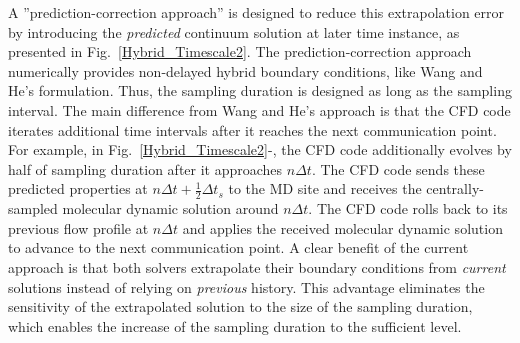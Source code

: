 \documentclass[preprint,12pt]{elsarticle}
\begin{document}

A ''prediction-correction approach'' is designed to reduce this 
extrapolation error by introducing the \textit{predicted} continuum solution at
later time instance, as presented in Fig.~\ref{Hybrid_Timescale2}.
The prediction-correction approach numerically provides non-delayed hybrid
boundary conditions, like Wang and He's formulation. Thus, the sampling
duration is designed as long as the sampling interval.
The main difference from Wang and He's approach is that the CFD code
iterates additional time intervals after it reaches the next communication point.
For example, in Fig.~\ref{Hybrid_Timescale2}-,
the CFD code additionally evolves by half of sampling duration after
it approaches $n{\Delta}t$. The CFD code sends these predicted properties
at $n{\Delta}t + \frac{1}{2}{\Delta}{t_s}$ to the MD site and receives the
centrally-sampled molecular dynamic solution around $n{\Delta}t$.
The CFD code rolls back to its previous flow profile at $n{\Delta}t$ and
applies the received molecular dynamic solution to advance to the next
communication point.
A clear benefit of the current approach is that both solvers extrapolate
their boundary conditions from \textit{current} solutions instead of
relying on \textit{previous} history. This advantage eliminates the
sensitivity of the extrapolated solution to the size of the sampling duration,
which enables the increase of the sampling duration to the sufficient level.
\end{document}
